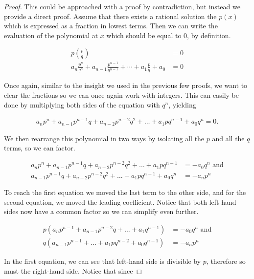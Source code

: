 \begin{proof}
	This could be approached with a proof by contradiction, but instead we provide a direct proof. Assume that there exists a rational solution the $p(x)$ which is expressed as a fraction in lowest terms. Then we can write the evaluation of the polynomial at $x$ which should be equal to 0, by definition.
	
	\begin{align*}
		p\left( \frac{p}{q} \right) &= 0 \\
		a_n \frac{p^n}{q^n} + a_{n - 1} \frac{p^{n - 1}}{q^{n - 1}} + \cdots + a_1 \frac{p}{q} + a_0 &= 0 
	\end{align*}
	
	Once again, similar to the insight we used in the previous few proofs, we want to clear the fractions so we can once again work    with integers. This can easily be done by multiplying both sides of the equation with $q^n$, yielding
	
	\begin{align*}
		a_n p^n + a_{n - 1} p^{n - 1} q + a_{n - 2} p^{n - 2} q^2 + \dots + a_1 p q^{n - 1} + a_0 q^n = 0.
	\end{align*}
	
	We then rearrange this polynomial in two ways by isolating all the $p$ and all the $q$ terms, so we can factor.
	
	\begin{align*}
		a_n p^n + a_{n - 1} p^{n - 1} q + a_{n - 2} p^{n - 2} q^2 + \dots + a_1 p q^{n - 1} &= - a_0 q^n \text{ and} \\
		a_{n - 1} p^{n - 1} q + a_{n - 2} p^{n - 2} q^2 + \dots + a_1 p q^{n - 1} + a_0 q^n &= -a_n p^n
	\end{align*}
	
	To reach the first equation we moved the last term to the other side, and for the second equation, we moved the leading coefficient. Notice that both left-hand sides now have a common factor so we can simplify even further.
	
	\begin{align*}
		p (a_n p^{n - 1} + a_{n - 1} p^{n - 2} q + \dots + a_1 q^{n - 1}) &= - a_0 q^n \text{ and} \\
		q (a_{n - 1} p^{n - 1} + \dots + a_1 p q^{n - 2} + a_0 q^{n - 1}) &= -a_n p^n
	\end{align*}
	
	In the first equation, we can see that left-hand side is divisible by $p$, therefore so must the right-hand side. Notice that since
	

\end{proof}
